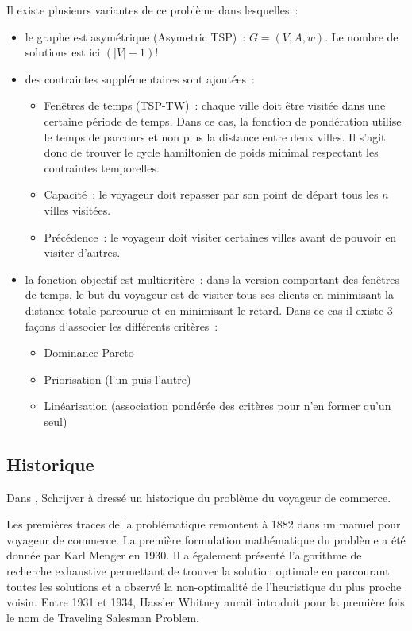 Il existe plusieurs variantes de ce problème dans lesquelles~: 
\begin{itemize}
 \item le graphe est asymétrique (Asymetric TSP)~: $G = (V,A,w)$. Le nombre de solutions est ici $(|V|-1)!$
 \item des contraintes supplémentaires sont ajoutées~: 
 \begin{itemize}
  \item Fenêtres de temps (TSP-TW)~: chaque ville doit être visitée dans une certaine période de temps. Dans ce cas, la fonction de pondération utilise le temps de parcours et non plus la distance entre deux villes. Il s'agit donc de trouver le cycle hamiltonien de poids minimal respectant les contraintes temporelles.
  \item Capacité~: le voyageur doit repasser par son point de départ tous les $n$ villes visitées.
  \item Précédence~: le voyageur doit visiter certaines villes avant de pouvoir en visiter d'autres.
 \end{itemize}
 \item la fonction objectif est multicritère~: dans la version comportant des fenêtres de temps, le but du voyageur est de visiter tous ses clients en minimisant la distance totale parcourue et en minimisant le retard. Dans ce cas il existe 3 façons d'associer les différents critères~: 
   \begin{itemize}
    \item Dominance Pareto
    \item Priorisation (l'un puis l'autre)
    \item Linéarisation (association pondérée des critères pour n'en former qu'un seul)
   \end{itemize}
\end{itemize}

 \subsection{Historique}
 \label{sec:tsp:historique}
 
 Dans \cite{Schrijver2005}, Schrijver à dressé un historique du problème du voyageur de commerce.
 
 Les premières traces de la problématique remontent à 1882 dans un manuel pour voyageur de commerce. La première formulation mathématique du problème a été donnée par Karl Menger en 1930. Il a également présenté l'algorithme de recherche exhaustive permettant de trouver la solution optimale en parcourant toutes les solutions et a observé la non-optimalité de l'heuristique du plus proche voisin. Entre 1931 et 1934, Hassler Whitney aurait introduit pour la première fois le nom de Traveling Salesman Problem.
 
